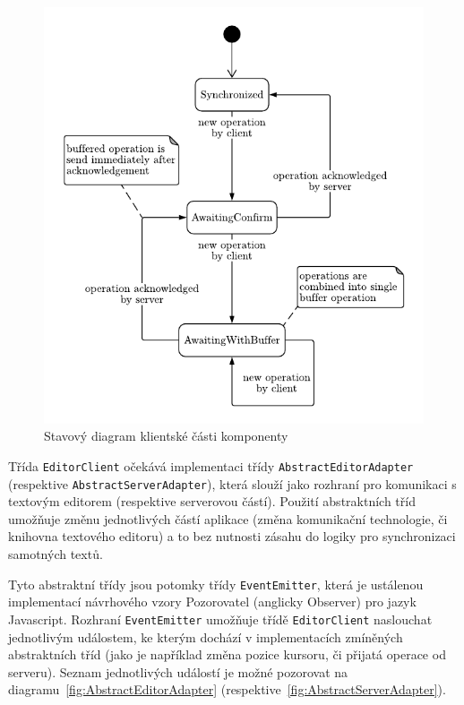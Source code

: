 \begin{figure}[ht!]
    \centering
    \includegraphics[width=\textwidth]{partials/navrh/stavovyDiagram.pdf}
    \caption{Stavový diagram klientské části komponenty}\label{fig:stavovyDiagram}
\end{figure}

Třída \texttt{EditorClient} očekává implementaci třídy \texttt{AbstractEditorAdapter} (respektive \texttt{AbstractServerAdapter}), která slouží jako rozhraní pro komunikaci s textovým editorem (respektive serverovou částí).
Použití abstraktních tříd umožňuje změnu jednotlivých částí aplikace (změna komunikační technologie, či knihovna textového editoru) a to bez nutnosti zásahu do logiky pro synchronizaci samotných textů.

Tyto abstraktní třídy jsou potomky třídy \texttt{EventEmitter}, která je ustálenou implementací návrhového vzory Pozorovatel (anglicky Observer) pro jazyk Javascript.
Rozhraní \texttt{EventEmitter} umožňuje třídě \texttt{EditorClient} naslouchat jednotlivým událostem, ke kterým dochází v implementacích zmíněných abstraktních tříd (jako je například změna pozice kursoru, či přijatá operace od serveru).
Seznam jednotlivých událostí je možné pozorovat na diagramu~\ref{fig:AbstractEditorAdapter} (respektive~\ref{fig:AbstractServerAdapter}).

